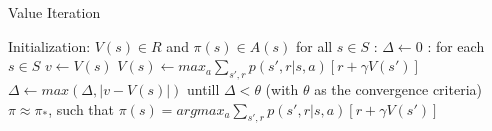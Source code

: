 \documentclass[a4paper,11pt]{article}
\begin{document}
 
\begin{algorithm}
	\caption{Value Iteration} 
	\begin{algorithmic}[1]
		\State Initialization:
			\Require $V(s) \in R$ and $\pi(s) \in A(s) $  for all $ s \in S $ 
			\Loop :  $\Delta \leftarrow 0$
				\Loop : for each $s \in S$ 
					\State $v \leftarrow V(s)$
					\State $V(s) \leftarrow max_a \sum_{s',r} p(s',r|s, a)[r+\gamma V(s')]$
					\State $\Delta \leftarrow max(\Delta, |v-V(s)|)$
				\EndLoop
				\State untill  $\Delta < \theta$ (with $\theta$ as the convergence criteria) 
			\EndLoop \State
		\Return $\pi \approx \pi_*$, such that $ \pi(s) = argmax_a \sum_{s',r} p(s',r|s, a)[r+\gamma V(s')]$


	\end{algorithmic} 
\end{algorithm}
\end{document}
